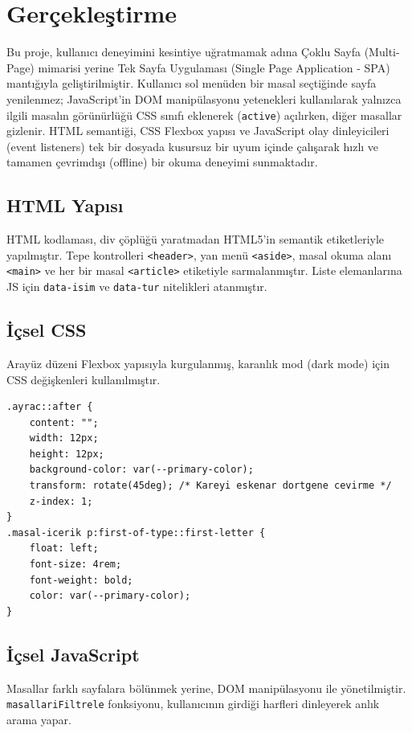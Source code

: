 \documentclass[12pt,a4paper]{article}
\begin{document}
\section{Gerçekleştirme}
Bu proje, kullanıcı deneyimini kesintiye uğratmamak adına Çoklu Sayfa (Multi-Page) mimarisi yerine Tek Sayfa Uygulaması (Single Page Application - SPA) mantığıyla geliştirilmiştir. Kullanıcı sol menüden bir masal seçtiğinde sayfa yenilenmez; JavaScript'in DOM manipülasyonu yetenekleri kullanılarak yalnızca ilgili masalın görünürlüğü CSS sınıfı eklenerek (\texttt{active}) açılırken, diğer masallar gizlenir. HTML semantiği, CSS Flexbox yapısı ve JavaScript olay dinleyicileri (event listeners) tek bir dosyada kusursuz bir uyum içinde çalışarak hızlı ve tamamen çevrimdışı (offline) bir okuma deneyimi sunmaktadır.

\subsection{HTML Yapısı}
HTML kodlaması, div çöplüğü yaratmadan HTML5'in semantik etiketleriyle yapılmıştır. Tepe kontrolleri \texttt{<header>}, yan menü \texttt{<aside>}, masal okuma alanı \texttt{<main>} ve her bir masal \texttt{<article>} etiketiyle sarmalanmıştır. Liste elemanlarına JS için \texttt{data-isim} ve \texttt{data-tur} nitelikleri atanmıştır.

\subsection{İçsel CSS}
Arayüz düzeni Flexbox yapısıyla kurgulanmış, karanlık mod (dark mode) için CSS değişkenleri kullanılmıştır.

\begin{lstlisting}[caption={Icsel CSS'ten onemli bir bolum}]
.ayrac::after {
    content: "";
    width: 12px;
    height: 12px;
    background-color: var(--primary-color);
    transform: rotate(45deg); /* Kareyi eskenar dortgene cevirme */
    z-index: 1;
}
.masal-icerik p:first-of-type::first-letter {
    float: left;
    font-size: 4rem;
    font-weight: bold;
    color: var(--primary-color);
}
\end{lstlisting}

\subsection{İçsel JavaScript}
Masallar farklı sayfalara bölünmek yerine, DOM manipülasyonu ile yönetilmiştir. \texttt{masallariFiltrele} fonksiyonu, kullanıcının girdiği harfleri dinleyerek anlık arama yapar.
\end{document}
